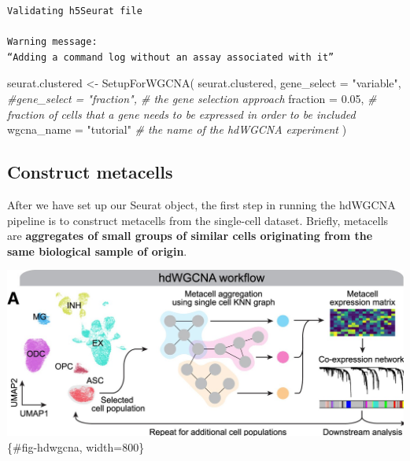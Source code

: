 \documentclass[
  letterpaper,
  DIV=11,
  numbers=noendperiod]{scrartcl}
\newenvironment{Shaded}{}{}
\newcommand{\AttributeTok}[1]{\textcolor[rgb]{0.49,0.56,0.16}{#1}}
\newcommand{\CommentTok}[1]{\textcolor[rgb]{0.38,0.63,0.69}{\textit{#1}}}
\newcommand{\FloatTok}[1]{\textcolor[rgb]{0.25,0.63,0.44}{#1}}
\newcommand{\FunctionTok}[1]{\textcolor[rgb]{0.02,0.16,0.49}{#1}}
\newcommand{\NormalTok}[1]{#1}
\newcommand{\OtherTok}[1]{\textcolor[rgb]{0.00,0.44,0.13}{#1}}
\newcommand{\StringTok}[1]{\textcolor[rgb]{0.25,0.44,0.63}{#1}}
\begin{document}
\begin{verbatim}
Validating h5Seurat file

Warning message:
“Adding a command log without an assay associated with it”
\end{verbatim}

\begin{Shaded}
\begin{Highlighting}[]
\NormalTok{seurat.clustered }\OtherTok{\textless{}{-}} \FunctionTok{SetupForWGCNA}\NormalTok{(}
\NormalTok{  seurat.clustered,}
  \AttributeTok{gene\_select =} \StringTok{"variable"}\NormalTok{,}
  \CommentTok{\#gene\_select = "fraction", \# the gene selection approach}
  \AttributeTok{fraction =} \FloatTok{0.05}\NormalTok{, }\CommentTok{\# fraction of cells that a gene needs to be expressed in order to be included}
  \AttributeTok{wgcna\_name =} \StringTok{"tutorial"} \CommentTok{\# the name of the hdWGCNA experiment}
\NormalTok{)}
\end{Highlighting}
\end{Shaded}

\subsection{Construct metacells}\label{construct-metacells}

After we have set up our Seurat object, the first step in running the
hdWGCNA pipeline is to construct metacells from the single-cell dataset.
Briefly, metacells are \textbf{aggregates of small groups of similar
cells originating from the same biological sample of origin}.

\includegraphics{./images/hdwgcna.jpg} \{\#fig-hdwgcna, width=800\}
\end{document}
